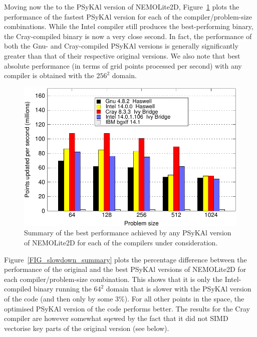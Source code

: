 \documentclass[gmd, manuscript]{copernicus}
\newlength{\picwidth}
\begin{document}
Moving now the to the {PS}y{KA}l version of NEMOLite2D,
Figure~\ref{FIG_best_psykal_perf_summary} plots the performance of the
fastest {PS}y{KA}l version for each of the compiler/problem-size combinations.
While the Intel compiler still produces the best-performing binary,
the Cray-compiled binary is now a very close second. In fact, the
performance of both the Gnu- and Cray-compiled {PS}y{KA}l versions is
generally significantly greater than that of their respective original
versions. We also note that best absolute performance (in terms of
grid points processed per second) with any compiler is obtained with
the $256^2$ domain.

\begin{figure}[!t]
\centering
\includegraphics[width=\picwidth]{best_psykal_summary}
\caption{Summary of the best performance achieved by any {PS}y{KA}l 
version of NEMOLite2D for each of the compilers under consideration.}
\label{FIG_best_psykal_perf_summary}
\end{figure}

Figure~\ref{FIG_slowdown_summary} plots the percentage difference
between the performance of the original and the best {PS}y{KA}l versions
of NEMOLite2D for each compiler/problem-size combination. This shows that it is
only the Intel-compiled binary running the $64^2$ domain that is
slower with the {PS}y{KA}l version of the code (and then only by some
3\%). For all other points in the space, the optimised {PS}y{KA}l version
of the code performs better. The results for the Cray compiler are
however somewhat sqewed by the fact that it did not SIMD vectorise key
parts of the original version (see below).
\end{document}
